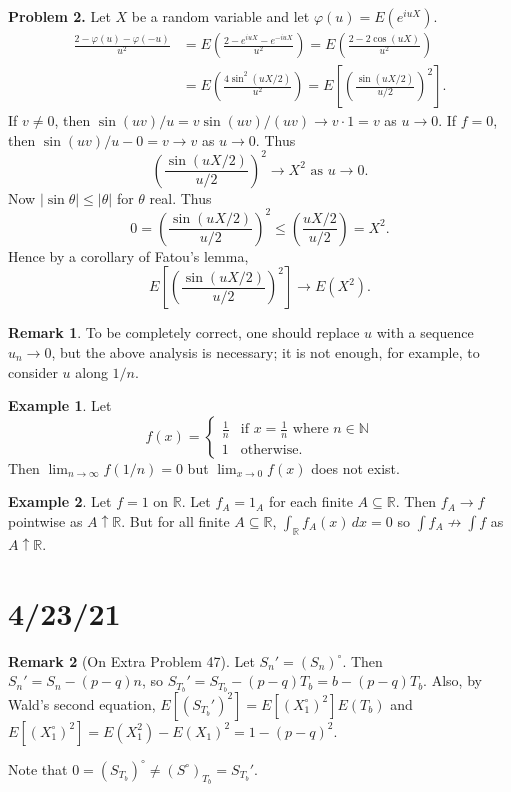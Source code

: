 \documentclass{article}
\newcommand{\R}{\mathbb{R}}
\newcommand{\N}{\mathbb{N}}
\theoremstyle{definition}
\newtheorem*{example}{Example}
\newtheorem*{remark}{Remark}
\begin{document}
\textbf{Problem 2.} Let $X$ be a random variable and let $\varphi(u) = E(e^{iuX})$.
\begin{align*}
    \frac{2 - \varphi(u) - \varphi(-u)}{u^2} &= E\left(\frac{2 - e^{iuX} - e^{-iuX}}{u^2}\right) = E\left(\frac{2 - 2\cos(uX)}{u^2}\right) \\
    &= E\left(\frac{4\sin^2(uX/2)}{u^2}\right) = E\left[\left(\frac{\sin(uX/2)}{u/2}\right)^2\right].
\end{align*}
If $v \neq 0$, then $\sin(uv)/u = v\sin(uv)/(uv) \to v \cdot 1 = v$ as $u \to 0$. If $f = 0$, then $\sin(uv)/u - 0 = v \to v$ as $u \to 0$. Thus
\[
    \left(\frac{\sin(uX/2)}{u/2}\right)^2 \to X^2 \text{ as } u \to 0.
\]
Now $|\sin\theta| \leq |\theta|$ for $\theta$ real. Thus
\[
    0 = \left(\frac{\sin(uX/2)}{u/2}\right)^2 \leq \left(\frac{uX/2}{u/2}\right) = X^2.
\]
Hence by a corollary of Fatou's lemma,
\[
    E\left[\left(\frac{\sin(uX/2)}{u/2}\right)^2\right] \to E(X^2).
\]
\begin{remark}
To be completely correct, one should replace $u$ with a sequence $u_n \to 0$, but the above analysis is necessary; it is not enough, for example, to consider $u$ along $1/n$.
\end{remark}
\begin{example}
Let
\[
    f(x) = \begin{cases}
        \frac{1}{n} &\text{if } x = \frac{1}{n} \text{ where } n \in \N \\
        1 &\text{otherwise}.
    \end{cases}
\]
Then $\lim_{n \to \infty} f(1/n) = 0$ but $\lim_{x \to 0} f(x)$ does not exist.
\end{example}
\begin{example}
Let $f = 1$ on $\R$. Let $f_A = 1_A$ for each finite $A \subseteq \R$. Then $f_A \to f$ pointwise as $A \uparrow \R$. But for all finite $A \subseteq \R$, $\int_\R f_A(x) \,dx = 0$ so $\int f_A \not\to \int f$ as $A \uparrow \R$.
\end{example}

\section*{4/23/21}
\begin{remark}[On Extra Problem 47]
Let $S_n' = (S_n)^\circ$. Then $S_n' = S_n - (p-q)n$, so $S_{T_b}' = S_{T_b} - (p-q)T_b = b - (p-q)T_b$. Also, by Wald's second equation, $E[(S_{T_b}')^2] = E[(X_1^\circ)^2]E(T_b)$ and $E[(X_1^\circ)^2] = E(X_1^2) - E(X_1)^2 = 1 - (p-q)^2$.

Note that $0 = (S_{T_b})^\circ \neq (S^\circ)_{T_b}= S_{T_b}'$.
\end{remark}
\end{document}
